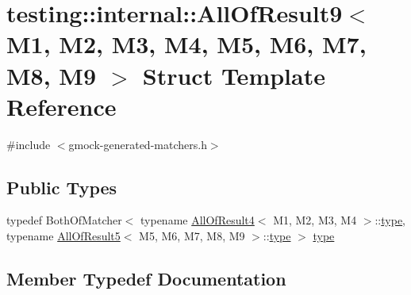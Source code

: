 \hypertarget{structtesting_1_1internal_1_1_all_of_result9}{}\section{testing\+::internal\+::All\+Of\+Result9$<$ M1, M2, M3, M4, M5, M6, M7, M8, M9 $>$ Struct Template Reference}
\label{structtesting_1_1internal_1_1_all_of_result9}


{\ttfamily \#include $<$gmock-\/generated-\/matchers.\+h$>$}

\subsection*{Public Types}
\begin{DoxyCompactItemize}
\item 
typedef Both\+Of\+Matcher$<$ typename \mbox{\hyperlink{structtesting_1_1internal_1_1_all_of_result4}{All\+Of\+Result4}}$<$ M1, M2, M3, M4 $>$\+::\mbox{\hyperlink{structtesting_1_1internal_1_1_all_of_result9_ade56e18d2e0b745968b87fc394710edc}{type}}, typename \mbox{\hyperlink{structtesting_1_1internal_1_1_all_of_result5}{All\+Of\+Result5}}$<$ M5, M6, M7, M8, M9 $>$\+::\mbox{\hyperlink{structtesting_1_1internal_1_1_all_of_result9_ade56e18d2e0b745968b87fc394710edc}{type}} $>$ \mbox{\hyperlink{structtesting_1_1internal_1_1_all_of_result9_ade56e18d2e0b745968b87fc394710edc}{type}}
\end{DoxyCompactItemize}


\subsection{Member Typedef Documentation}
\mbox{\label{structtesting_1_1internal_1_1_all_of_result9_ade56e18d2e0b745968b87fc394710edc}} 
